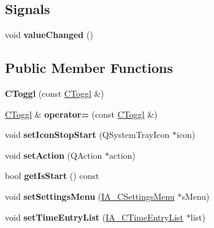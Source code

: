 \subsection*{Signals}
\begin{DoxyCompactItemize}
\item 
\mbox{\label{classCToggl_a4554d8e2138df838fb305a76c1d2e65d}} 
void {\bfseries value\+Changed} ()
\end{DoxyCompactItemize}
\subsection*{Public Member Functions}
\begin{DoxyCompactItemize}
\item 
\mbox{\label{classCToggl_ab82713b4764520768307a35cb6213116}} 
{\bfseries C\+Toggl} (const \hyperlink{classCToggl}{C\+Toggl} \&)
\item 
\mbox{\label{classCToggl_a5f46bb04d834bab9f77e933e8664698f}} 
\hyperlink{classCToggl}{C\+Toggl} \& {\bfseries operator=} (const \hyperlink{classCToggl}{C\+Toggl} \&)
\item 
\mbox{\label{classCToggl_aa426ce9b0aea665fffdca26aeaf190b1}} 
void {\bfseries set\+Icon\+Stop\+Start} (Q\+System\+Tray\+Icon $\ast$icon)
\item 
\mbox{\label{classCToggl_af3d7d562358471897c8017c0b567e389}} 
void {\bfseries set\+Action} (Q\+Action $\ast$action)
\item 
\mbox{\label{classCToggl_a18fb51b2a633a1c381f689d23dddc698}} 
bool {\bfseries get\+Is\+Start} () const
\item 
\mbox{\label{classCToggl_ac3538c136f6bdd812eeed14b745c3466}} 
void {\bfseries set\+Settings\+Menu} (\hyperlink{classIA__CSettingsMenu}{I\+A\+\_\+\+C\+Settings\+Menu} $\ast$s\+Menu)
\item 
\mbox{\label{classCToggl_ad982b7b0f9bd29a10110e4f4367830d0}} 
void {\bfseries set\+Time\+Entry\+List} (\hyperlink{classIA__CTimeEntryList}{I\+A\+\_\+\+C\+Time\+Entry\+List} $\ast$list)
\item 
\mbox{\label{classCToggl_a18535c0cc1484cd32acd93013bb41d4f}} 

\end{DoxyCompactItemize}
